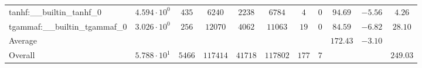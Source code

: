 \begin{tabular}{|l|c|c|c|c|c|c|c|c|c|c|}
tanhf:\_\_builtin\_tanhf\_0               & $ 4.594 \cdot 10^{0}  $ & $ 435    $ & $ 6240   $ & $ 2238  $ & $ 6784   $ & $ 4   $ & $ 0 $ & $ 94.69       $ & $ -5.56   $ & $ 4.26    $ \\
tgammaf:\_\_builtin\_tgammaf\_0           & $ 3.026 \cdot 10^{0}  $ & $ 256    $ & $ 12070  $ & $ 4062  $ & $ 11063  $ & $ 19  $ & $ 0 $ & $ 84.59       $ & $ -6.82   $ & $ 28.10   $ \\
\hline
Average                                   & $                     $ & $        $ & $        $ & $       $ & $        $ & $     $ & $   $ & $ 172.43      $ & $ -3.10   $ & $         $ \\
\hline
Overall                                   & $ 5.788 \cdot 10^{1}  $ & $ 5466   $ & $ 117414 $ & $ 41718 $ & $ 117802 $ & $ 177 $ & $ 7 $ & $             $ & $         $ & $ 249.03  $ \\
\hline
\end{tabular}
